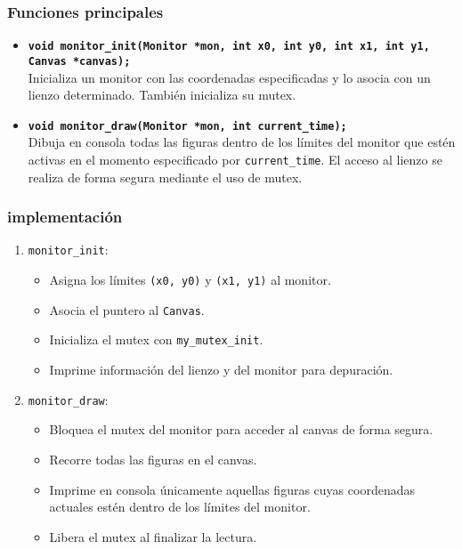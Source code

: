 \documentclass[12pt]{article}
\begin{document}
\subsubsection*{Funciones principales}

\begin{itemize}
  \item \textbf{\texttt{void monitor\_init(Monitor *mon, int x0, int y0, int x1, int y1, Canvas *canvas);}}\\
  Inicializa un monitor con las coordenadas especificadas y lo asocia con un lienzo determinado. También inicializa su mutex.

  \item \textbf{\texttt{void monitor\_draw(Monitor *mon, int current\_time);}}\\
  Dibuja en consola todas las figuras dentro de los límites del monitor que estén activas en el momento especificado por \texttt{current\_time}. El acceso al lienzo se realiza de forma segura mediante el uso de mutex.
\end{itemize}

\subsubsection*{implementación}

\begin{enumerate}
  \item \texttt{monitor\_init}:
  \begin{itemize}
    \item Asigna los límites \texttt{(x0, y0)} y \texttt{(x1, y1)} al monitor.
    \item Asocia el puntero al \texttt{Canvas}.
    \item Inicializa el mutex con \texttt{my\_mutex\_init}.
    \item Imprime información del lienzo y del monitor para depuración.
  \end{itemize}

  \item \texttt{monitor\_draw}:
  \begin{itemize}
    \item Bloquea el mutex del monitor para acceder al canvas de forma segura.
    \item Recorre todas las figuras en el canvas.
    \item Imprime en consola únicamente aquellas figuras cuyas coordenadas actuales estén dentro de los límites del monitor.
    \item Libera el mutex al finalizar la lectura.
  \end{itemize}
\end{enumerate}
\end{document}
